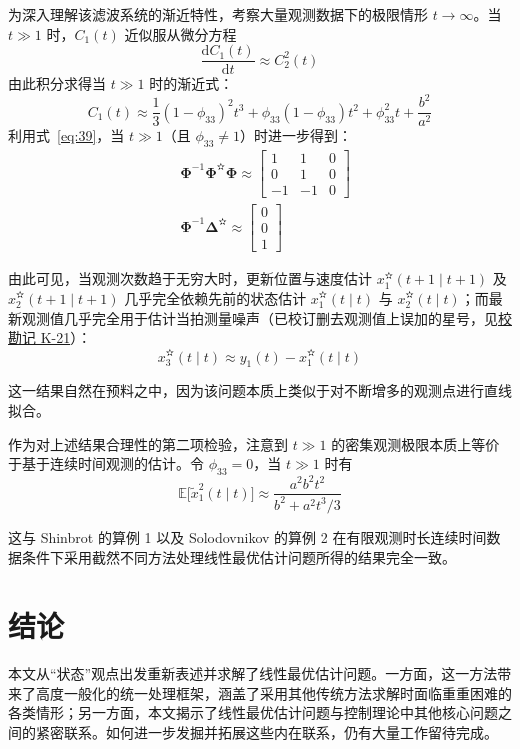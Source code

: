 \begin{example}
为深入理解该滤波系统的渐近特性，考察大量观测数据下的极限情形 $t \to \infty$。当 $t \gg 1$ 时，$C_1(t)$ 近似服从微分方程
\begin{equation*}
\frac{\mathrm{d}C_1(t)}{\mathrm{d}t} \approx C_2^2(t)
\end{equation*}
由此积分求得当 $t \gg 1$ 时的渐近式：
\begin{equation}\label{eq:39}
C_1(t) \approx \frac{1}{3}(1 - \phi_{33})^2 t^3 + \phi_{33}(1 - \phi_{33})t^2 + \phi_{33}^2 t + \frac{b^2}{a^2}
\end{equation}
利用式~\eqref{eq:39}，当 $t \gg 1$（且 $\phi_{33} \neq 1$）时进一步得到：
\begin{equation*}
\begin{aligned}
&\bm{\Phi}^{-1}\bm{\Phi}^{\text{✫}}\bm{\Phi} \approx \begin{bmatrix} 1 & 1 & 0 \\ 0 & 1 & 0 \\ -1 & -1 & 0 \end{bmatrix} \\
&\bm{\Phi}^{-1}\bm{\Delta}^{\text{✫}} \approx \begin{bmatrix} 0 \\ 0 \\ 1 \end{bmatrix}
\end{aligned}
\end{equation*}

由此可见，当观测次数趋于无穷大时，更新位置与速度估计 $x_1^{\text{✫}}(t + 1 \mid t + 1)$ 及 $x_2^{\text{✫}}(t + 1 \mid t + 1)$ 几乎完全依赖先前的状态估计 $x_1^{\text{✫}}(t \mid t)$ 与 $x_2^{\text{✫}}(t \mid t)$；而最新观测值几乎完全用于估计当拍测量噪声（已校订删去观测值上误加的星号，见\hyperref[sec:k21]{校勘记 K-21}）：
\begin{equation*}
x_3^{\text{✫}}(t \mid t) \approx y_1(t) - x_1^{\text{✫}}(t \mid t)
\end{equation*}

这一结果自然在预料之中，因为该问题本质上类似于对不断增多的观测点进行直线拟合。

作为对上述结果合理性的第二项检验，注意到 $t \gg 1$ 的密集观测极限本质上等价于基于连续时间观测的估计。令 $\phi_{33} = 0$，当 $t \gg 1$ 时有
\begin{equation*}
\mathbb{E}\bigl[\tilde{x}_1^2(t \mid t)\bigr] \approx \frac{a^2 b^2 t^2}{b^2 + a^2 t^3 / 3}
\end{equation*}

这与 Shinbrot\cite{r11} 的算例 1 以及 Solodovnikov\cite{r14} 的算例 2 在有限观测时长连续时间数据条件下采用截然不同方法处理线性最优估计问题所得的结果完全一致。

\end{example}

\section{结论}\label{sec:conc}

本文从“状态”观点出发重新表述并求解了线性最优估计问题。一方面，这一方法带来了高度一般化的统一处理框架，涵盖了采用其他传统方法求解时面临重重困难的各类情形；另一方面，本文揭示了线性最优估计问题与控制理论中其他核心问题之间的紧密联系。如何进一步发掘并拓展这些内在联系，仍有大量工作留待完成。

